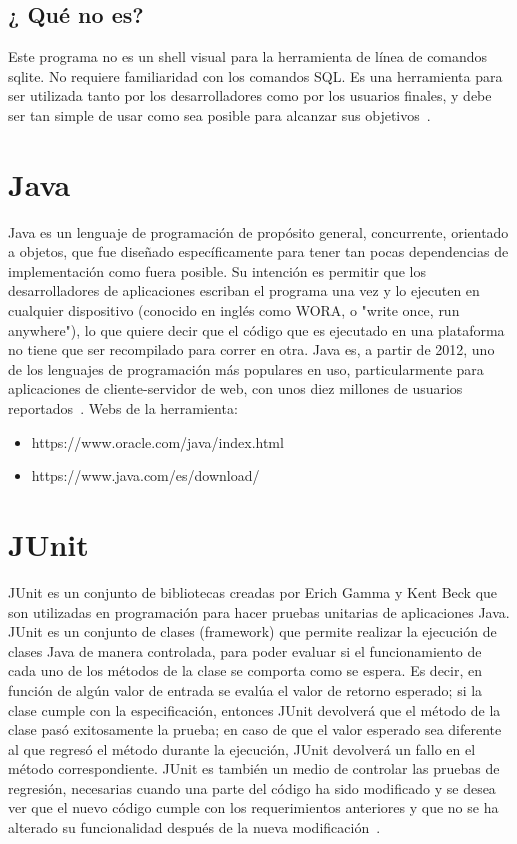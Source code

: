 \subsection{¿ Qué no es?}
Este programa no es un shell visual para la herramienta de línea de comandos sqlite. No requiere familiaridad con los comandos SQL. Es una herramienta para ser utilizada tanto por los desarrolladores como por los usuarios finales, y debe ser tan simple de usar como sea posible para alcanzar sus objetivos~\cite{sqlitebrowser}.
\section{Java}
Java es un lenguaje de programación de propósito general, concurrente, orientado a objetos, que fue diseñado específicamente para tener tan pocas dependencias de implementación como fuera posible. Su intención es permitir que los desarrolladores de aplicaciones escriban el programa una vez y lo ejecuten en cualquier dispositivo (conocido en inglés como WORA, o "write once, run anywhere"), lo que quiere decir que el código que es ejecutado en una plataforma no tiene que ser recompilado para correr en otra. Java es, a partir de 2012, uno de los lenguajes de programación más populares en uso, particularmente para aplicaciones de cliente-servidor de web, con unos diez millones de usuarios reportados~\cite{wiki:java}. 
Webs de la herramienta:
\begin{itemize}
	\item https://www.oracle.com/java/index.html
	\item https://www.java.com/es/download/
\end{itemize}
\section{JUnit}

JUnit es un conjunto de bibliotecas creadas por Erich Gamma y Kent Beck que son utilizadas en programación para hacer pruebas unitarias de aplicaciones Java.
JUnit es un conjunto de clases (framework) que permite realizar la ejecución de clases Java de manera controlada, para poder evaluar si el funcionamiento de cada uno de los métodos de la clase se comporta como se espera. Es decir, en función de algún valor de entrada se evalúa el valor de retorno esperado; si la clase cumple con la especificación, entonces JUnit devolverá que el método de la clase pasó exitosamente la prueba; en caso de que el valor esperado sea diferente al que regresó el método durante la ejecución, JUnit devolverá un fallo en el método correspondiente.
JUnit es también un medio de controlar las pruebas de regresión, necesarias cuando una parte del código ha sido modificado y se desea ver que el nuevo código cumple con los requerimientos anteriores y que no se ha alterado su funcionalidad después de la nueva modificación~\cite{wiki:junit}.
